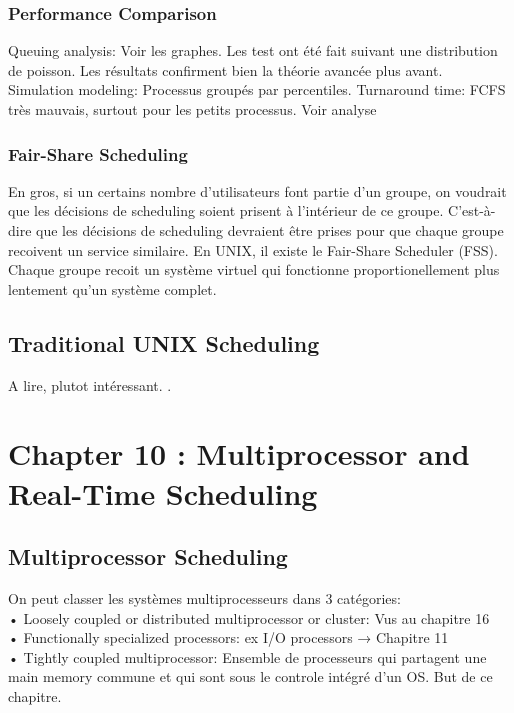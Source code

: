 \subsubsection{Performance Comparison}
Queuing analysis: Voir les graphes. Les test ont été fait suivant une distribution de poisson. Les résultats confirment bien la théorie avancée plus avant. Simulation modeling: Processus groupés par percentiles. Turnaround time: FCFS très mauvais, surtout pour les petits processus. Voir analyse \cite[p.~420]{stallings}
\subsubsection{Fair-Share Scheduling}
En gros, si un certains nombre d'utilisateurs font partie d'un groupe, on voudrait que les décisions de scheduling soient prisent à l'intérieur de ce groupe. C'est-à-dire que les décisions de scheduling devraient être prises pour que chaque groupe recoivent un service similaire. En UNIX, il existe le Fair-Share Scheduler (FSS). Chaque groupe recoit un système virtuel qui fonctionne proportionellement plus lentement qu'un système complet.
\subsection{Traditional UNIX Scheduling}
A lire, plutot intéressant. \cite[p.~423]{stallings}.

\newpage


\section{Chapter 10 : Multiprocessor and Real-Time Scheduling}


\subsection{Multiprocessor Scheduling}
On peut classer les systèmes multiprocesseurs dans 3 catégories: \\
• Loosely coupled or distributed multiprocessor or cluster: Vus au chapitre 16 \\
• Functionally specialized processors: ex I/O processors → Chapitre 11 \\
• Tightly coupled multiprocessor: Ensemble de processeurs qui partagent une main memory commune et qui sont sous le controle intégré d'un OS. But de ce chapitre.
